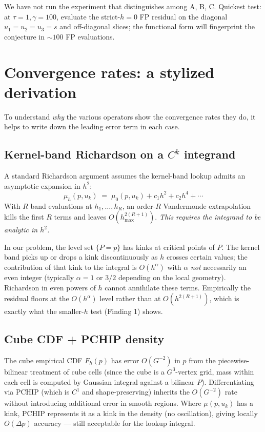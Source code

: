 \documentclass[11pt]{article}
\begin{document}
We have not run the experiment that distinguishes among A, B, C.
Quickest test: at $\tau = 1, \gamma = 100$, evaluate the strict-$h{=}0$
FP residual on the diagonal $u_1 = u_2 = u_3 = s$ and off-diagonal
slices; the functional form will fingerprint the conjecture in
$\sim 100$ FP evaluations.

\section{Convergence rates: a stylized derivation}

To understand \emph{why} the various operators show the convergence
rates they do, it helps to write down the leading error term in each
case.

\subsection{Kernel-band Richardson on a $C^k$ integrand}

A standard Richardson argument assumes the kernel-band lookup admits
an asymptotic expansion in $h^2$:
\[
  \mu_h(p, u_k) \;=\; \mu_0(p, u_k) + c_1 h^2 + c_2 h^4 + \cdots
\]
With $R$ band evaluations at $h_1, \ldots, h_R$, an order-$R$
Vandermonde extrapolation kills the first $R$ terms and leaves
$O(h_{\max}^{2(R+1)})$. \emph{This requires the integrand to be
analytic in $h^2$.}

In our problem, the level set $\{P = p\}$ has kinks at critical
points of $P$. The kernel band picks up or drops a kink
discontinuously as $h$ crosses certain values; the contribution of
that kink to the integral is $O(h^\alpha)$ with $\alpha$ \emph{not}
necessarily an even integer (typically $\alpha = 1$ or $3/2$
depending on the local geometry). Richardson in even powers of $h$
cannot annihilate these terms. Empirically the residual floors at the
$O(h^\alpha)$ level rather than at $O(h^{2(R+1)})$, which is exactly
what the smaller-$h$ test (Finding 1) shows.

\subsection{Cube CDF + PCHIP density}

The cube empirical CDF $F_h(p)$ has error $O(G^{-2})$ in $p$ from the
piecewise-bilinear treatment of cube cells (since the cube is a
$G^3$-vertex grid, mass within each cell is computed by Gaussian
integral against a bilinear $P$). Differentiating via PCHIP (which is
$C^1$ and shape-preserving) inherits the $O(G^{-2})$ rate without
introducing additional error in smooth regions. Where $\mu(p, u_k)$
has a kink, PCHIP represents it as a kink in the density (no
oscillation), giving locally $O(\Delta p)$ accuracy --- still
acceptable for the lookup integral.
\end{document}
